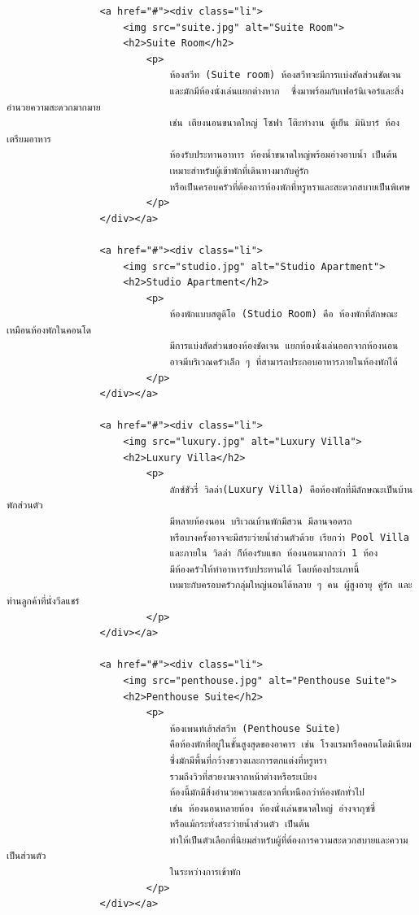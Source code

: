 \documentclass{report}
\begin{document}
\begin{verbatim}
                <a href="#"><div class="li">
                    <img src="suite.jpg" alt="Suite Room">
                    <h2>Suite Room</h2>
                        <p>
                            ห้องสวีท (Suite room) ห้องสวีทจะมีการแบ่งสัดส่วนชัดเจน 
                            และมักมีห้องนั่งเล่นแยกต่างหาก  ซึ่งมาพร้อมกับเฟอร์นิเจอร์และสิ่งอำนวยความสะดวกมากมาย 
                            เช่น เตียงนอนขนาดใหญ่ โซฟา โต๊ะทำงาน ตู้เย็น มินิบาร์ ห้องเตรียมอาหาร 
                            ห้องรับประทานอาหาร ห้องน้ำขนาดใหญ่พร้อมอ่างอาบน้ำ เป็นต้น 
                            เหมาะสำหรับผู้เข้าพักที่เดินทางมากับคู่รัก 
                            หรือเป็นครอบครัวที่ต้องการห้องพักที่หรูหราและสะดวกสบายเป็นพิเศษ
                        </p>
                </div></a>

                <a href="#"><div class="li">
                    <img src="studio.jpg" alt="Studio Apartment">     
                    <h2>Studio Apartment</h2>
                        <p>
                            ห้องพักแบบสตูดิโอ (Studio Room) คือ ห้องพักที่ลักษณะเหมือนห้องพักในคอนโด 
                            มีการแบ่งสัดส่วนของห้องชัดเจน แยกห้องนั่งเล่นออกจากห้องนอน 
                            อาจมีบริเวณครัวเล็ก ๆ ที่สามารถประกอบอาหารภายในห้องพักได้
                        </p>
                </div></a>

                <a href="#"><div class="li">
                    <img src="luxury.jpg" alt="Luxury Villa">
                    <h2>Luxury Villa</h2>
                        <p>
                            ลักซ์ชัวรี่ วิลล่า(Luxury Villa) คือห้องพักที่มีลักษณะเป็นบ้านพักส่วนตัว 
                            มีหลายห้องนอน บริเวณบ้านพักมีสวน มีลานจอดรถ 
                            หรือบางครั้งอาจจะมีสระว่ายน้ำส่วนตัวด้วย เรียกว่า Pool Villa 
                            และภายใน วิลล่า ก็ห้องรับแขก ห้องนอนมากกว่า 1 ห้อง 
                            มีห้องครัวให้ทำอาหารรับประทานได้ โดยห้องประเภทนี้ 
                            เหมาะกับครอบครัวกลุ่มใหญ่นอนได้หลาย ๆ คน ผู้สูงอายุ คู่รัก และ ท่านลูกค้าที่นั่งวีลแชร์
                        </p>
                </div></a>
                
                <a href="#"><div class="li">
                    <img src="penthouse.jpg" alt="Penthouse Suite">
                    <h2>Penthouse Suite</h2>
                        <p>
                            ห้องเพนท์เฮ้าส์สวีท (Penthouse Suite) 
                            คือห้องพักที่อยู่ในชั้นสูงสุดของอาคาร เช่น โรงแรมหรือคอนโดมิเนียม 
                            ซึ่งมักมีพื้นที่กว้างขวางและการตกแต่งที่หรูหรา 
                            รวมถึงวิวที่สวยงามจากหน้าต่างหรือระเบียง 
                            ห้องนี้มักมีสิ่งอำนวยความสะดวกที่เหนือกว่าห้องพักทั่วไป 
                            เช่น ห้องนอนหลายห้อง ห้องนั่งเล่นขนาดใหญ่ อ่างจากุซซี่ 
                            หรือแม้กระทั่งสระว่ายน้ำส่วนตัว เป็นต้น 
                            ทำให้เป็นตัวเลือกที่นิยมสำหรับผู้ที่ต้องการความสะดวกสบายและความเป็นส่วนตัว
                            ในระหว่างการเข้าพัก
                        </p>
                </div></a>
                

\end{verbatim}
\end{document}
